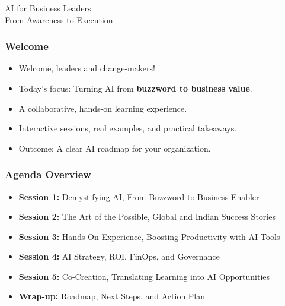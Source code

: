 \begin{frame}[fragile]\frametitle{}
\begin{center}
{\Large AI for Business Leaders}\\[0.5em]
{\large From Awareness to Execution}
\end{center}
\end{frame}

\begin{frame}[fragile]\frametitle{Welcome}

\begin{itemize}
  \item Welcome, leaders and change-makers!
  \item Today's focus: Turning AI from \textbf{buzzword to business value}.
  \item A collaborative, hands-on learning experience.
  \item Interactive sessions, real examples, and practical takeaways.
  \item Outcome: A clear AI roadmap for your organization.
\end{itemize}

\end{frame}

\begin{frame}[fragile]\frametitle{Agenda Overview}

\begin{itemize}
  \item \textbf{Session 1:} Demystifying AI, From Buzzword to Business Enabler
  \item \textbf{Session 2:} The Art of the Possible, Global and Indian Success Stories
  \item \textbf{Session 3:} Hands-On Experience, Boosting Productivity with AI Tools
  \item \textbf{Session 4:} AI Strategy, ROI, FinOps, and Governance
  \item \textbf{Session 5:} Co-Creation, Translating Learning into AI Opportunities
  \item \textbf{Wrap-up:} Roadmap, Next Steps, and Action Plan
\end{itemize}

\end{frame}

